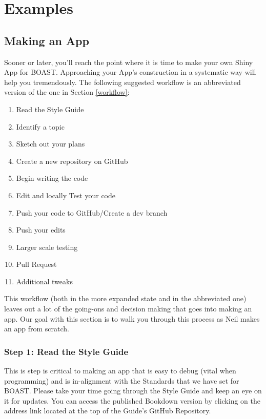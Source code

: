 \documentclass[
]{book}
\providecommand{\tightlist}{%
  \setlength{\itemsep}{0pt}\setlength{\parskip}{0pt}}
\begin{document}
\hypertarget{part-examples}{%
\part{Examples}\label{part-examples}}

\hypertarget{makingApp}{%
\chapter{Making an App}\label{makingApp}}

Sooner or later, you'll reach the point where it is time to make your own Shiny App for BOAST. Approaching your App's construction in a systematic way will help you tremendously. The following suggested workflow is an abbreviated version of the one in Section \ref{workflow}:

\begin{enumerate}
\def\labelenumi{\arabic{enumi}.}
\tightlist
\item
  Read the Style Guide
\item
  Identify a topic
\item
  Sketch out your plans
\item
  Create a new repository on GitHub
\item
  Begin writing the code
\item
  Edit and locally Test your code
\item
  Push your code to GitHub/Create a dev branch
\item
  Push your edits
\item
  Larger scale testing
\item
  Pull Request
\item
  Additional tweaks
\end{enumerate}

This workflow (both in the more expanded state and in the abbreviated one) leaves out a lot of the going-ons and decision making that goes into making an app. Our goal with this section is to walk you through this process as Neil makes an app from scratch.

\hypertarget{step1}{%
\section{Step 1: Read the Style Guide}\label{step1}}

This is step is critical to making an app that is easy to debug (vital when programming) and is in-alignment with the Standards that we have set for BOAST. Please take your time going through the Style Guide and keep an eye on it for updates. You can access the published Bookdown version by clicking on the address link located at the top of the Guide's GitHub Repository.
\end{document}
